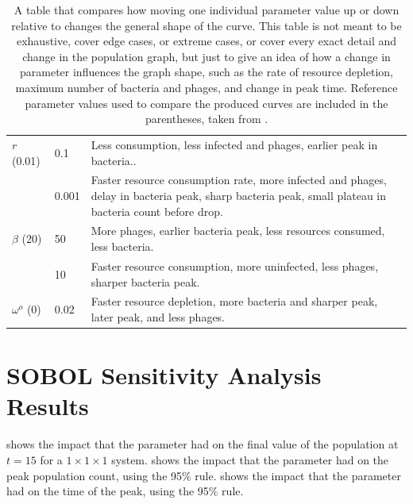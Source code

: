 \begin{table}
\begin{tabularx}{\textwidth}{l l X}
        \midrule
        $r$ (0.01) & 0.1 & Less consumption, less infected and phages, earlier peak in bacteria..\\
         & 0.001 & Faster resource consumption rate, more infected and phages, delay in bacteria peak, sharp bacteria peak, small plateau in bacteria count before drop.\\

        \midrule
        $\beta$ (20) & 50 & More phages, earlier bacteria peak, less resources consumed, less bacteria.\\
         & 10 & Faster resource consumption, more uninfected, less phages, sharper bacteria peak.\\

        \midrule
        $\omega^o$ (0) & 0.02 & Faster resource depletion, more bacteria and sharper peak, later peak, and less phages. \\

        \bottomrule
    \end{tabularx}
    \caption{
        A table that compares how moving one individual parameter value up or down relative to  changes the general shape of the curve. 
        This table is not meant to be exhaustive, cover edge cases, or extreme cases, or cover every exact detail and change in the population graph, but just to give an idea of how a change in parameter influences the graph shape, such as the rate of resource depletion, maximum number of bacteria and phages, and change in peak time. 
        Reference parameter values used to compare the produced curves are included in the parentheses, taken from . 
    }
    \label{tab:results:graph_behavior}
\end{table}

\section{SOBOL Sensitivity Analysis Results}
\label{sec:SOBOL_sensitivity_analysis_results}

 shows the impact that the parameter had on the final value of the population at $t=15$ for a $1\times 1\times 1$ system. 
 shows the impact that the parameter had on the peak population count, using the 95\% rule. 
 shows the impact that the parameter had on the time of the peak, using the 95\% rule. 

